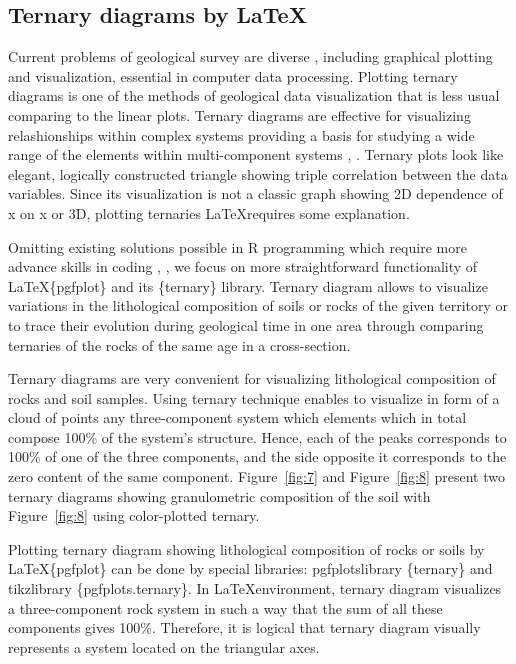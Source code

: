 \documentclass[a4paper,10pt]{article}
\begin{document}
\subsection{Ternary diagrams by \LaTeX}

Current problems of geological survey are diverse \cite{Lemenkov2016a}, \cite{Lemenkov2016b} including graphical plotting and visualization, essential in computer data processing. Plotting ternary diagrams is one of the methods of geological data visualization that is less usual comparing to the linear plots. Ternary diagrams are effective for visualizing relashionships within complex systems providing a basis for studying a wide range of the elements within multi-component systems \cite{West1982}, \cite{West2017}.
Ternary plots look like elegant, logically constructed triangle showing triple correlation between the data variables. Since its visualization is not a classic graph showing 2D dependence of x on x or 3D, plotting ternaries \LaTeX \space requires some explanation. 

Omitting existing solutions possible in R programming which require more advance skills in coding \cite{Lemenkova201999}, \cite{Lemenkova201991}, we focus on more straightforward functionality of \LaTeX \space \{pgfplot\} and its \{ternary\} library. Ternary diagram allows to visualize variations in the lithological composition of soils or rocks of the given territory or to trace their evolution during geological time in one area through comparing ternaries of the rocks of the same age in a cross-section.

Ternary diagrams are very convenient for visualizing lithological composition of rocks and soil samples. Using ternary technique enables to visualize in form of a cloud of points any three-component system which elements which in total compose 100\% of the system's structure. Hence, each of the peaks corresponds to 100\% of one of the three components, and the side opposite it corresponds to the zero content of the same component. Figure~\ref{fig:7} and Figure~\ref{fig:8} present two ternary diagrams showing granulometric composition of the soil with Figure~\ref{fig:8} using color-plotted ternary. 

Plotting ternary diagram showing lithological composition of rocks or soils by \LaTeX \{pgfplot\} can be done by special libraries: pgfplotslibrary \{ternary\} and tikzlibrary \{pgfplots.ternary\}. In \LaTeX \space environment, ternary diagram visualizes a three-component rock system in such a way that the sum of all these components gives 100\%. Therefore, it is logical that ternary diagram visually represents a system located on the triangular axes. 
\end{document}
